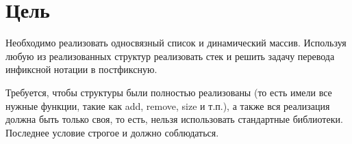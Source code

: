 
\section{Цель}


Необходимо реализовать односвязный список и динамический массив.
Используя любую из реализованных структур реализовать стек и решить
задачу перевода инфиксной нотации в постфиксную.

Требуется, чтобы структуры были полностью реализованы
(то есть имели все нужные функции, такие как add, remove, size и т.п.), а
также вся реализация должна быть только своя, то есть, нельзя использовать
стандартные библиотеки. Последнее условие строгое и должно соблюдаться.
